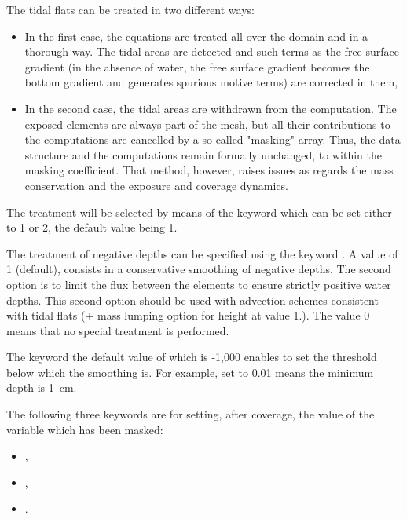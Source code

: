The tidal flats can be treated in two different ways:

\begin{itemize}
\item In the first case, the equations are treated all over the domain and in
a thorough way. The tidal areas are detected and such terms as the free surface
gradient (in the absence of water, the free surface gradient becomes the bottom
gradient and generates spurious motive terms) are corrected in them,

\item In the second case, the tidal areas are withdrawn from the computation.
The exposed elements are always part of the mesh, but all their contributions
to the computations are cancelled by a so-called "masking" array. Thus, the
data structure and the computations remain formally unchanged, to within the
masking coefficient. That method, however, raises issues as regards the mass
conservation and the exposure and coverage dynamics.
\end{itemize}

The treatment will be selected by means of the keyword  which can be set either to 1 or 2, the default value
being 1.

The treatment of negative depths can be specified using the keyword
. A value of 1 (default), consists in a
conservative smoothing of negative depths. The second option is to limit the
flux between the elements to ensure strictly positive water depths. This second
option should be used with advection schemes consistent with tidal flats (+
mass lumping option for height at value 1.). The value 0 means that no special
treatment is performed.

The keyword  the default value of which is
-1,000 enables to set the threshold below which the smoothing is. For example,
 set to 0.01 means the minimum depth is 1~cm.

The following three keywords are for setting, after coverage, the value of the
variable which has been masked:

\begin{itemize}
\item {},

\item {},

\item {}.
\end{itemize}


